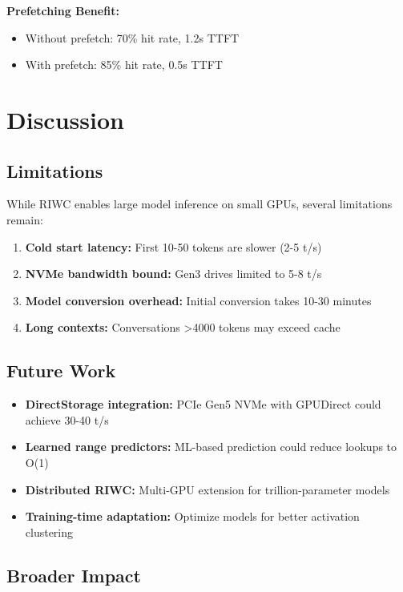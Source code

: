 \documentclass[twocolumn,10pt]{article}
\begin{document}
\textbf{Prefetching Benefit:}
\begin{itemize}
    \item Without prefetch: 70\% hit rate, 1.2s TTFT
    \item With prefetch: 85\% hit rate, 0.5s TTFT
\end{itemize}

\section{Discussion}

\subsection{Limitations}

While RIWC enables large model inference on small GPUs, several limitations remain:

\begin{enumerate}
    \item \textbf{Cold start latency:} First 10-50 tokens are slower (2-5 t/s)
    \item \textbf{NVMe bandwidth bound:} Gen3 drives limited to 5-8 t/s
    \item \textbf{Model conversion overhead:} Initial conversion takes 10-30 minutes
    \item \textbf{Long contexts:} Conversations >4000 tokens may exceed cache
\end{enumerate}

\subsection{Future Work}

\begin{itemize}
    \item \textbf{DirectStorage integration:} PCIe Gen5 NVMe with GPUDirect could achieve 30-40 t/s
    \item \textbf{Learned range predictors:} ML-based prediction could reduce lookups to O(1)
    \item \textbf{Distributed RIWC:} Multi-GPU extension for trillion-parameter models
    \item \textbf{Training-time adaptation:} Optimize models for better activation clustering
\end{itemize}

\subsection{Broader Impact}
\end{document}
